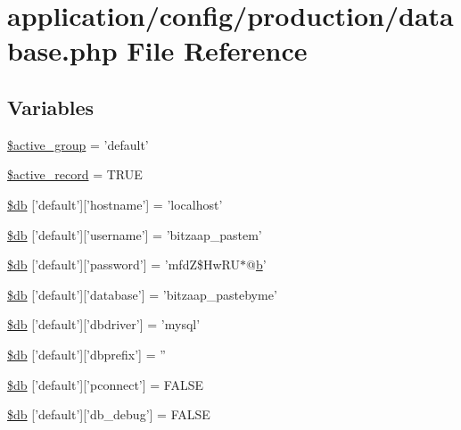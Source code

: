 \hypertarget{production_2database_8php}{\section{application/config/production/database.php File Reference}
\label{production_2database_8php}
}
\subsection*{Variables}
\begin{DoxyCompactItemize}
\item 
\hyperlink{production_2database_8php_a5046ea83a698c5b7bbf6ffd3dd816b65}{\$active\-\_\-group} = 'default'
\item 
\hyperlink{production_2database_8php_a228b6ea91602f48a8831d0dc94809b94}{\$active\-\_\-record} = T\-R\-U\-E
\item 
\hyperlink{production_2database_8php_a987b8cb0ae83b9519cb7c36fe25dbdd8}{\$db} \mbox{[}'default'\mbox{]}\mbox{[}'hostname'\mbox{]} = 'localhost'
\item 
\hyperlink{production_2database_8php_a2f535f16fa00521992cfc791c8dcec37}{\$db} \mbox{[}'default'\mbox{]}\mbox{[}'username'\mbox{]} = 'bitzaap\-\_\-pastem'
\item 
\hyperlink{production_2database_8php_a1f6afce218438d9f7d13e28ee602e29b}{\$db} \mbox{[}'default'\mbox{]}\mbox{[}'password'\mbox{]} = 'mfd\-Z\$\-Hw\-R\-U$\ast$@\hyperlink{bootstrap_8min_8js_a7c192e47b11481e4717b9f1e04eb4420}{b}'
\item 
\hyperlink{production_2database_8php_a87e73e2a5365d1ee95a673b551238fef}{\$db} \mbox{[}'default'\mbox{]}\mbox{[}'database'\mbox{]} = 'bitzaap\-\_\-pastebyme'
\item 
\hyperlink{production_2database_8php_a9f97429a3096d60fa26291b35f6cb7a9}{\$db} \mbox{[}'default'\mbox{]}\mbox{[}'dbdriver'\mbox{]} = 'mysql'
\item 
\hyperlink{production_2database_8php_ae0a3c1b4e2a1907dc70671ee97901456}{\$db} \mbox{[}'default'\mbox{]}\mbox{[}'dbprefix'\mbox{]} = ''
\item 
\hyperlink{production_2database_8php_a0bf35d484095b6728c2666580924569b}{\$db} \mbox{[}'default'\mbox{]}\mbox{[}'pconnect'\mbox{]} = F\-A\-L\-S\-E
\item 
\hyperlink{production_2database_8php_aa79c6a73d78063a2b2ee6903a9851908}{\$db} \mbox{[}'default'\mbox{]}\mbox{[}'db\-\_\-debug'\mbox{]} = F\-A\-L\-S\-E
\item 

\end{DoxyCompactItemize}
